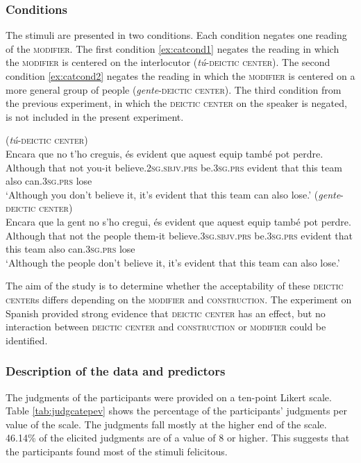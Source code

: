 \subsubsection{Conditions} The stimuli are presented in two conditions. Each condition negates one reading of the \textsc{modifier}. The first condition \eqref{ex:catcond1} negates the reading in which the \textsc{modifier} is centered on the interlocutor (\textit{tú}-\textsc{deictic center}). The second condition \eqref{ex:catcond2} negates the reading in which the \textsc{modifier} is centered on a more general group of people (\textit{gente}-\textsc{deictic center}). The third condition from the previous experiment, in which the \textsc{deictic center} on the speaker is negated, is not included in the present experiment. 

\ea	
\ea\label{ex:catcond1} (\textit{tú}-\textsc{deictic center})\\ \gll Encara que no t'ho creguis, és evident que aquest equip també pot perdre. \\
Although that not you-it believe.\textsc{2sg.sbjv.prs} be.\textsc{3sg.prs} evident that this team also can.\textsc{3sg.prs} lose\\
\glt `Although you don't believe it, it's evident that this team can also lose.'
\ex\label{ex:catcond2} (\textit{gente}-\textsc{deictic center}) \\ \gll Encara que  la gent no s'ho cregui, és evident que aquest equip també pot perdre. \\
Although that not  the people them-it believe.\textsc{3sg.sbjv.prs} be.\textsc{3sg.prs} evident that this team also can.\textsc{3sg.prs} lose\\
\glt `Although the people don't believe it, it's evident that this team can also lose.'  
\z
\z

The aim of the study is to determine whether the acceptability of these \textsc{deictic center}s differs depending on the \textsc{modifier} and \textsc{construction}. The experiment on Spanish provided strong evidence that \textsc{deictic center} has an effect, but no interaction between \textsc{deictic center} and \textsc{construction} or \textsc{modifier} could be identified. 
\subsubsection{Description of the data and predictors}
The judgments of the participants were provided on a ten-point Likert scale. Table \ref{tab:judgcatepev} shows the percentage of the participants' judgments per value of the scale. The judgments fall mostly at the higher end of the scale.  46.14\% of the elicited judgments are of a value of 8 or higher. This suggests that the participants found most of the stimuli felicitous.

